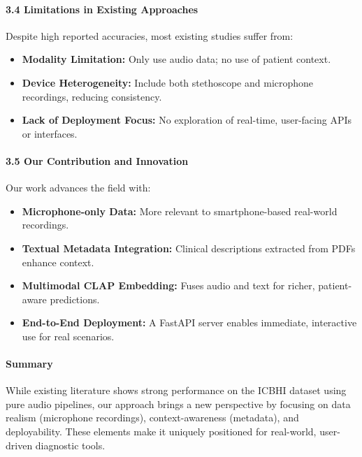\paragraph{3.4 Limitations in Existing Approaches\\}
Despite high reported accuracies, most existing studies suffer from:
\begin{itemize}
    \item \textbf{Modality Limitation:} Only use audio data; no use of patient context.
    \item \textbf{Device Heterogeneity:} Include both stethoscope and microphone recordings, reducing consistency.
    \item \textbf{Lack of Deployment Focus:} No exploration of real-time, user-facing APIs or interfaces.
\end{itemize}
\paragraph{3.5 Our Contribution and Innovation\\}
Our work advances the field with:
\begin{itemize}
    \item \textbf{Microphone-only Data:} More relevant to smartphone-based real-world recordings.
    \item \textbf{Textual Metadata Integration:} Clinical descriptions extracted from PDFs enhance context.
    \item \textbf{Multimodal CLAP Embedding:} Fuses audio and text for richer, patient-aware predictions.
    \item \textbf{End-to-End Deployment:} A FastAPI server enables immediate, interactive use for real scenarios.
\end{itemize}
\paragraph{Summary\\}
While existing literature shows strong performance on the ICBHI dataset using pure audio pipelines, our approach brings a new perspective by focusing on data realism (microphone recordings), context-awareness (metadata), and deployability. These elements make it uniquely positioned for real-world, user-driven diagnostic tools.